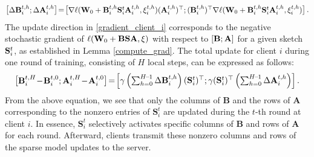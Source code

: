 \documentclass{article} %
\theoremstyle{plain}
\theoremstyle{definition}
\begin{document}
\begin{itemize}[topsep=0pt,itemsep=4pt,parsep=0pt, partopsep=0pt, leftmargin=*]
\begin{equation} 
\begin{bmatrix}
{\Delta} {\bf B}_i^{t,h};
{\Delta} {\bf A}_i^{t,h}
\end{bmatrix}
\!=\!
\begin{bmatrix}
\nabla \ell({\bf W}_0 + {\bf B}_i^{t,h} {\bf S}_i^t {\bf A}_i^{t,h}, \xi_i^{t,h})  ({\bf A}_i^{t,h})^{\top};
({\bf B}_i^{t,h})^{\top} \nabla \ell({\bf W}_0 + {\bf B}_i^{t,h} {\bf S}_i^t {\bf A}_i^{t,h}, {\xi}_i^{t,h})
\end{bmatrix}.
\nonumber
\end{equation}
The update direction in \eqref{gradient_client_i} corresponds to the negative stochastic gradient of \(\ell({\bf W}_0 + {\bf B} {\bf S} {\bf A}, \xi)\) with respect to \([{\bf B}; {\bf A}]\) for a given sketch \( {\bf S}_i^t\), as established in Lemma \ref{compute_grad}.   
The total update for client \(i\) during one round of training, consisting of \(H\) local steps, can be expressed as follows:
 \[ 
 \begin{bmatrix}
\mathbf{B}_i^{t,H} \!-\! \mathbf{B}_i^{t,0};
\mathbf{A}_i^{t,H} \!-\! \mathbf{A}_i^{t,0}
\end{bmatrix} 
\!=\! 
\begin{bmatrix}
\gamma \left( \sum_{h=0}^{H\!-\!1} {\Delta} {\bf B}_i^{t,h} \right) ({\bf S}_i^t)^{\top};
\gamma ({\bf S}_i^t)^{\top} \left(\sum_{h=0}^{H\!-\!1} {\Delta} {\bf A}_i^{t,h} \right) 
\end{bmatrix}. \]
From the above equation, we see that only the columns of \(\mathbf{B}\) and the rows of \(\mathbf{A}\) corresponding to the nonzero entries of \(\mathbf{S}_i^t\) are updated during the \(t\)-th round at client \(i\). In essence, \(\mathbf{S}_i^t\) selectively activates specific columns of \(\mathbf{B}\) and rows of \(\mathbf{A}\) for each round. Afterward, clients transmit these nonzero columns and rows of the sparse model updates to the server. 

\end{itemize}
\end{document}
